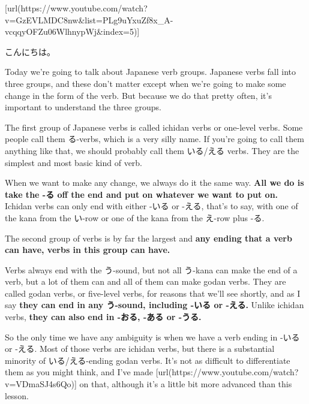 \startsectionlevel[title={{\bf 5. Verb Groups and the て-form}},reference={verb-groups-and-the-て-form}]

[url(https://www.youtube.com/watch?v=GzEVLMDC8nw&list=PLg9uYxuZf8x_A-vcqqyOFZu06WlhnypWj&index=5)]

こんにちは。

Today we're going to talk about Japanese verb groups. Japanese verbs fall into three groups, and these don't matter except when we're going to make some change in the form of the verb. But because we do that pretty often, it's important to understand the three groups.

\startsectionlevel[title={Ichidan verbs},reference={ichidan-verbs}]

The first group of Japanese verbs is called ichidan verbs or one-level verbs. Some people call them る-verbs, which is a very silly name. If you're going to call them anything like that, we should probably call them いる/える verbs. They are the simplest and most basic kind of verb.

{}

When we want to make any change, we always do it the same way. {\bf All we do is take the -る off the end and put on whatever we want to put on.} Ichidan verbs can only end with either -いる or -える, that's to say, with one of the kana from the い-row or one of the kana from the え-row plus -る.

{}

\stopsectionlevel

\startsectionlevel[title={Godan verbs},reference={godan-verbs}]

The second group of verbs is by far the largest and {\bf any ending that a verb can have, verbs in this group can have.}

{}

Verbs always end with the う-sound, but not all う-kana can make the end of a verb, but a lot of them can and all of them can make godan verbs. They are called godan verbs, or five-level verbs, for reasons that we'll see shortly, and as I say {\bf they can end in any う-sound, including -いる or -える.} Unlike ichidan verbs, {\bf they can also end in -おる, -ある or -うる.}

So the only time we have any ambiguity is when we have a verb ending in -いる or -える. Most of those verbs are ichidan verbs, but there is a substantial minority of いる/える-ending godan verbs. It's not as difficult to differentiate them as you might think, and I've made [url(https://www.youtube.com/watch?v=VDmaSJ4s6Qo)] on that, although it's a little bit more advanced than this lesson.

